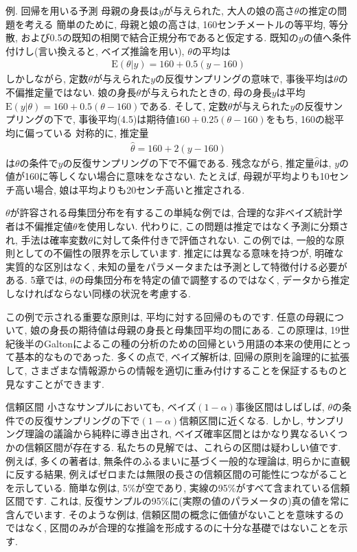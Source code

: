 \documentclass[10pt,dvipdfmx,a4]{beamer}
\newcommand{\eq}[1]{\begin{align}#1\end{align}}
\newcommand{\eqn}[1]{\begin{align*}#1\end{align*}}
\begin{document}

\begin{frame}{例. 回帰を用いる予測}
母親の身長は$y$が与えられた, 大人の娘の高さ$\theta$の推定の問題を考える
簡単のために, 母親と娘の高さは, 160センチメートルの等平均, 等分散, および0.5の既知の相関で結合正規分布であると仮定する.
既知の$y$の値へ条件付けし(言い換えると, ベイズ推論を用い), $\theta$の平均は
\eq{\text{E}(\theta|y)=160+0.5(y-160)}
しかしながら, 定数$\theta$が与えられた$y$の反復サンプリングの意味で, 事後平均は$\theta$の不偏推定量ではない.
娘の身長$\theta$が与えられたときの, 母の身長$y$は平均$\text{E}(y|\theta)=160+0.5(\theta-160)$である.
そして, 定数$\theta$が与えられた$y$の反復サンプリングの下で, 事後平均(4.5)は期待値$160+0.25(\theta-160)$をもち, 160の総平均に偏っている
対称的に, 推定量
\eqn{\hat{\theta}=160+2(y-160)}
は$\theta$の条件で$y$の反復サンプリングの下で不偏である.
残念ながら, 推定量$\hat{\theta}$は, $y$の値が160に等しくない場合に意味をなさない.
たとえば, 母親が平均よりも10センチ高い場合, 娘は平均よりも20センチ高いと推定される.
\end{frame}


\begin{frame}
$\theta$が許容される母集団分布を有するこの単純な例では, 合理的な非ベイズ統計学者は不偏推定値$\theta$を使用しない.
代わりに, この問題は推定ではなく予測に分類され, 手法は確率変数$\theta$に対して条件付きで評価されない.
この例では, 一般的な原則としての不偏性の限界を示しています.
推定には異なる意味を持つが, 明確な実質的な区別はなく, 未知の量をパラメータまたは予測として特徴付ける必要がある.
5章では, $\theta$の母集団分布を特定の値で調整するのではなく, データから推定しなければならない同様の状況を考慮する.

この例で示される重要な原則は, 平均に対する回帰のものです.
任意の母親について, 娘の身長の期待値は母親の身長と母集団平均の間にある.
この原理は, 19世紀後半のGaltonによるこの種の分析のための回帰という用語の本来の使用にとって基本的なものであった.
多くの点で, ベイズ解析は, 回帰の原則を論理的に拡張して, さまざまな情報源からの情報を適切に重み付けすることを保証するものと見なすことができます.
\end{frame}


\begin{frame}{信頼区間}
小さなサンプルにおいても, ベイズ$(1-\alpha)$事後区間はしばしば, $\theta$の条件での反復サンプリングの下で$(1-\alpha)$信頼区間に近くなる.
しかし, サンプリング理論の議論から純粋に導き出され, ベイズ確率区間とはかなり異なるいくつかの信頼区間が存在する.
私たちの見解では、これらの区間は疑わしい値です.
例えば, 多くの著者は, 無条件のふるまいに基づく一般的な理論は, 明らかに直観に反する結果, 例えばゼロまたは無限の長さの信頼区間の可能性につながることを示している.
簡単な例は, 5\%が空であり, 実線の95\%がすべて含まれている信頼区間です.
これは, 反復サンプルの95\%に(実際の値のパラメータの)真の値を常に含んでいます.
そのような例は, 信頼区間の概念に価値がないことを意味するのではなく, 区間のみが合理的な推論を形成するのに十分な基礎ではないことを示す.
\end{frame}
\end{document}
